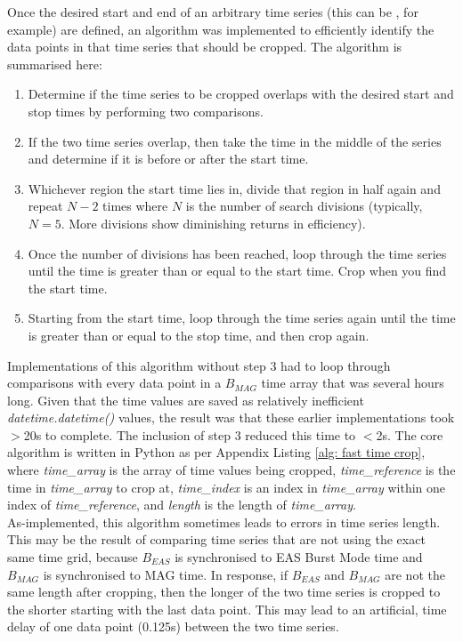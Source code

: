 Once the desired start and end of an arbitrary time series (this can be \Bmag, for example) are defined, an algorithm was implemented to efficiently identify the data points in that time series that should be cropped. The algorithm is summarised here:
\begin{enumerate}
    \item Determine if the time series to be cropped overlaps with the desired start and stop times by performing two comparisons.
    \item If the two time series overlap, then take the time in the middle of the series and determine if it is before or after the start time. 
    \item Whichever region the start time lies in, divide that region in half again and repeat \(N-2\) times where \(N\) is the number of search divisions (typically, \(N=5\). More divisions show diminishing returns in efficiency).
    \item Once the number of divisions has been reached, loop through the time series until the time is greater than or equal to the start time. Crop when you find the start time.
    \item Starting from the start time, loop through the time series again until the time is greater than or equal to the stop time, and then crop again.
\end{enumerate}

Implementations of this algorithm without step 3 had to loop through comparisons with every data point in a \(B_{MAG}\) time array that was several hours long. Given that the time values are saved as relatively inefficient \textit{datetime.datetime()} values, the result was that these earlier implementations took \(>\)20s to complete. The inclusion of step 3 reduced this time to \(<\)2s. The core algorithm is written in Python as per Appendix Listing \ref{alg: fast time crop}, where \textit{time\_array} is the array of time values being cropped, \textit{time\_reference} is the time in \textit{time\_array} to crop at, \textit{time\_index} is an index in \textit{time\_array} within one index of \textit{time\_reference}, and \textit{length} is the length of \textit{time\_array}.
\\

As-implemented, this algorithm sometimes leads to  errors in time series length. This may be the result of comparing time series that are not using the exact same time grid, because \(B_{EAS}\) is synchronised to EAS Burst Mode time and \(B_{MAG}\) is synchronised to MAG time. In response, if \(B_{EAS}\) and \(B_{MAG}\) are not the same length after cropping, then the longer of the two time series is cropped to the shorter starting with the last data point. This may lead to an artificial,  time delay of one data point (0.125s) between the two time series.

